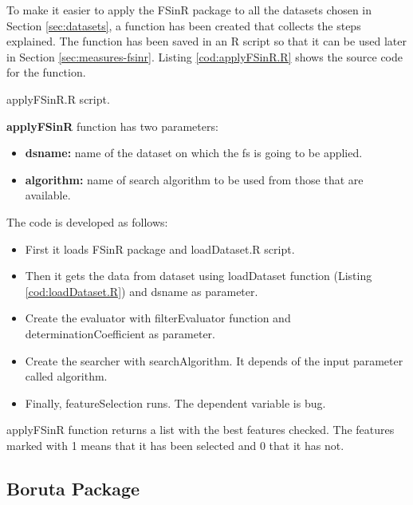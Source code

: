 To make it easier to apply the FSinR package to all the datasets chosen in Section \ref{sec:datasets}, a function has been created that collects the steps explained. The function has been saved in an R script so that it can be used later in Section \ref{sec:measures-fsinr}. Listing \ref{cod:applyFSinR.R} shows the source code for the function.

\begin{codefloat}[H]

\caption{applyFSinR.R script.}
\label{cod:applyFSinR.R}
\end{codefloat}

\textbf{applyFSinR} function has two parameters:

\begin{itemize}
    \item \textbf{dsname:} name of the dataset on which the \acrshort{fs} is going to be applied.
    
    \item \textbf{algorithm:} name of search algorithm to be used from those that are available.
\end{itemize}

The code is developed as follows:

\begin{itemize}
    \item First it loads FSinR package and loadDataset.R script.
    
    \item Then it gets the data from dataset using loadDataset function (Listing \ref{cod:loadDataset.R}) and dsname as parameter.
    
    \item Create the evaluator with filterEvaluator function and determinationCoefficient as parameter.
    
    \item Create the searcher with searchAlgorithm. It depends of the input parameter called algorithm.
    
    \item Finally, featureSelection runs. The dependent variable is bug.
\end{itemize}

applyFSinR function returns a list with the best features checked. The features marked with 1 means that it has been selected and 0 that it has not.

\subsection{Boruta Package}
\label{sec:boruta-package}

